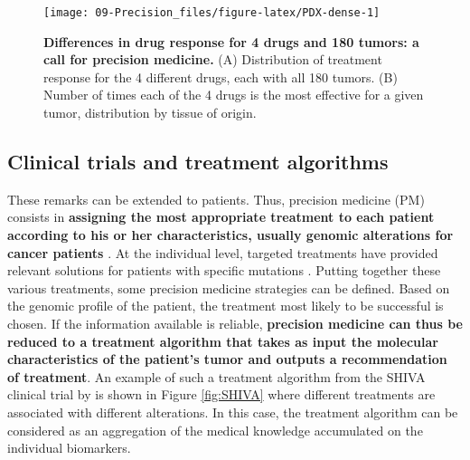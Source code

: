 \documentclass[a4paper,12pt,twoside,onecolumn,openright,final,oldfontcommands]{memoir}
\begin{document}
\begin{figure}

{\centering \texttt{[image: 09-Precision\_files/figure-latex/PDX-dense-1]} 

}

\caption[Differences in drug response for 4 drugs and 180 tumors: a call for precision medicine]{\textbf{Differences in drug response for 4 drugs
and 180 tumors: a call for precision medicine.} (A) Distribution of
treatment response for the 4 different drugs, each with all 180 tumors.
(B) Number of times each of the 4 drugs is the most effective for a
given tumor, distribution by tissue of origin.}\label{fig:PDX-dense}
\end{figure}







\subsection{Clinical trials and treatment
algorithms}\label{clinical-trials-and-treatment-algorithms}

These remarks can be extended to patients. Thus, precision medicine (PM)
consists in \textbf{assigning the most appropriate treatment to each
patient according to his or her characteristics, usually genomic
alterations for cancer patients}
\citep{friedman2015precision, de2015pragmatic}. At the individual level,
targeted treatments have provided relevant solutions for patients with
specific mutations \citep{abou2003overview}. Putting together these
various treatments, some precision medicine strategies can be defined.
Based on the genomic profile of the patient, the treatment most likely
to be successful is chosen. If the information available is reliable,
\textbf{precision medicine can thus be reduced to a treatment algorithm
that takes as input the molecular characteristics of the patient's tumor
and outputs a recommendation of treatment}. An example of such a
treatment algorithm from the SHIVA clinical trial by
\citet{le2015molecularly} is shown in Figure \ref{fig:SHIVA} where
different treatments are associated with different alterations. In this
case, the treatment algorithm can be considered as an aggregation of the
medical knowledge accumulated on the individual biomarkers.
\end{document}
